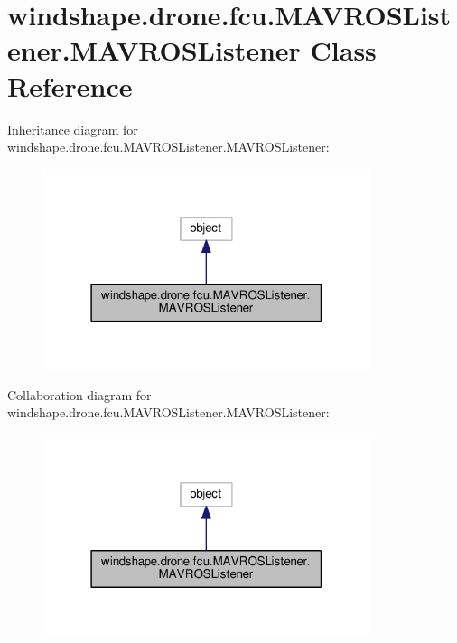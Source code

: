 \hypertarget{classwindshape_1_1drone_1_1fcu_1_1_m_a_v_r_o_s_listener_1_1_m_a_v_r_o_s_listener}{}\section{windshape.\+drone.\+fcu.\+M\+A\+V\+R\+O\+S\+Listener.\+M\+A\+V\+R\+O\+S\+Listener Class Reference}
\label{classwindshape_1_1drone_1_1fcu_1_1_m_a_v_r_o_s_listener_1_1_m_a_v_r_o_s_listener}


Inheritance diagram for windshape.\+drone.\+fcu.\+M\+A\+V\+R\+O\+S\+Listener.\+M\+A\+V\+R\+O\+S\+Listener\+:\nopagebreak
\begin{figure}[H]
\begin{center}
\leavevmode
\includegraphics[width=271pt]{classwindshape_1_1drone_1_1fcu_1_1_m_a_v_r_o_s_listener_1_1_m_a_v_r_o_s_listener__inherit__graph}
\end{center}
\end{figure}


Collaboration diagram for windshape.\+drone.\+fcu.\+M\+A\+V\+R\+O\+S\+Listener.\+M\+A\+V\+R\+O\+S\+Listener\+:\nopagebreak
\begin{figure}[H]
\begin{center}
\leavevmode
\includegraphics[width=271pt]{classwindshape_1_1drone_1_1fcu_1_1_m_a_v_r_o_s_listener_1_1_m_a_v_r_o_s_listener__coll__graph}
\end{center}
\end{figure}
